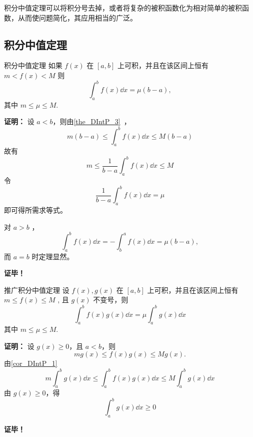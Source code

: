 
\begin{issues}
\issueDraft
\end{issues}

积分中值定理可以将积分号去掉，或者将复杂的被积函数化为相对简单的被积函数，从而使问题简化，其应用相当的广泛。

\subsection{积分中值定理}
\begin{theorem}{积分中值定理}
如果 $f(x)$ 在 $[a,b]$ 上可积，并且在该区间上恒有$m<f(x)<M$
则
\begin{equation}
\int_a^b f(x)\dd x=\mu(b-a),
\end{equation}
其中 $m\leq\mu\leq M.$
\end{theorem}

\textbf{证明：}
设 $a<b$，则由\autoref{the_DIntP_3}~，
\begin{equation}
m(b-a)\leq\int_a^b f(x)\dd x\leq M(b-a)
\end{equation}
故有
\begin{equation}
m\leq\frac{1}{b-a}\int_a^b f(x)\dd x\leq M
\end{equation}
令
\begin{equation}
\frac{1}{b-a}\int_a^b f(x)\dd x=\mu
\end{equation}
即可得所需求等式。

对 $a>b$ ，
\begin{equation}
\int_a^b f(x)\dd x=-\int_b^a f(x)\dd x=\mu(b-a),
\end{equation}
而 $a=b$ 时定理显然。 

\textbf{证毕！}

\begin{theorem}{推广积分中值定理}
设 $f(x),g(x)$ 在 $[a,b]$ 上可积，并且在该区间上恒有$m\leq f(x)\leq M$
, 且 $g(x)$ 不变号，则
\begin{equation}
\int_a^b f(x)g(x)\dd x=\mu\int_a^b g(x)\dd x
\end{equation}
其中 $m\leq\mu\leq M.$
\end{theorem}
\textbf{证明：}
设 $g(x)\geq 0$，且 $a<b$，则
\begin{equation}
mg(x)\leq f(x)g(x)\leq Mg(x).
\end{equation}
由\autoref{cor_DIntP_1}~
\begin{equation}
m\int_a^b g(x)\dd x\leq\int_a^b f(x)g(x)\dd x\leq M\int_a^b g(x)\dd x
\end{equation}
由 $g(x)\geq0$，得
\begin{equation}
\int_a^b g(x)\dd x\geq0
\end{equation}


\textbf{证毕！}